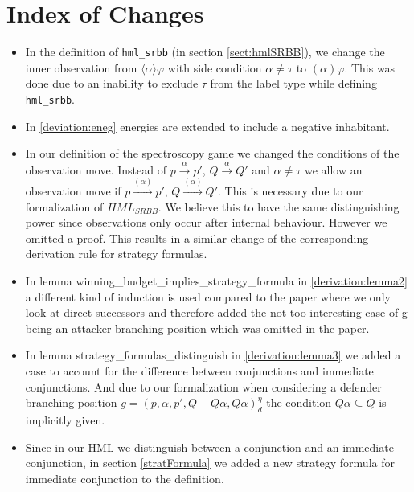 \section{Index of Changes}
\begin{itemize}
    \item In the definition of \texttt{hml\_srbb} (in section \ref{sect:hmlSRBB}), we change the inner observation from
      $\langle\alpha\rangle\varphi$ with side condition $\alpha \neq \tau$ to $(\alpha)\varphi$.
      This was done due to an inability to exclude $\tau$ from the label type while defining \texttt{hml\_srbb}. 
    \item In \ref{deviation:eneg} energies are extended to include a negative inhabitant. 
    \item In our definition of the spectroscopy game we changed the conditions of the observation move. 
    Instead of $p \overset{\alpha}{\longrightarrow}p'$, $Q \overset{\alpha}{\longrightarrow} Q'$ and $\alpha \neq \tau$
    we allow an observation move if  $p \overset{(\alpha)}{\longrightarrow}p'$, $Q \overset{(\alpha)}{\longrightarrow} Q'$.
    This is necessary due to our formalization of $HML_{SRBB}$. We believe this to have the same distinguishing power 
    since observations only occur after internal behaviour. However we omitted a proof. 
    This results in a similar change of the corresponding derivation rule for strategy formulas.
    \item In lemma winning\_budget\_implies\_strategy\_formula in \ref{derivation:lemma2} a different kind of induction is used compared to the paper 
    where we only look at direct successors and therefore added the not too interesting case of g being an 
    attacker branching position which was omitted in the paper.
   \item In lemma strategy\_formulas\_distinguish in  \ref{derivation:lemma3} we added a case to account for the difference between 
conjunctions and immediate conjunctions. And due to our formalization when considering a
defender branching position $g=(p,\alpha ,p', Q - Q\alpha, Q\alpha)_d^\eta$ the condition 
$Q \alpha \subseteq Q$ is implicitly given.
  \item Since in our HML we distinguish between a conjunction and an immediate conjunction, in section \ref{stratFormula} 
we added a new strategy formula for immediate conjunction to the definition.
\end{itemize}
